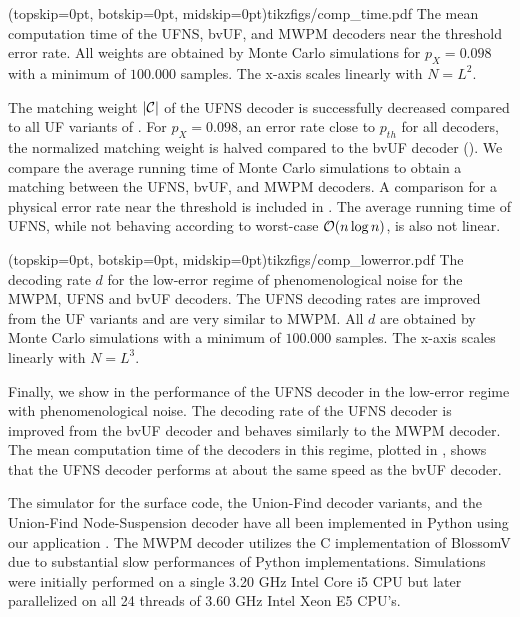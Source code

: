 \Figure[b!](topskip=0pt, botskip=0pt, midskip=0pt){tikzfigs/comp_time.pdf}{
  The mean computation time of the UFNS, bvUF, and MWPM decoders near the threshold error rate. All weights are obtained by Monte Carlo simulations for $p_X=0.098$ with a minimum of $100.000$ samples. The x-axis scales linearly with $N = L^2$.\label{comp_time}}

The matching weight $\lvert\mathcal{C}\rvert$ of the UFNS decoder is successfully decreased compared to all UF variants of . For $p_X = 0.098$, an error rate close to $p_{th}$ for all decoders, the normalized matching weight is halved compared to the bvUF decoder (). We compare the average running time of Monte Carlo simulations to obtain a matching between the UFNS, bvUF, and MWPM decoders. A comparison for a physical error rate near the threshold is included in . The average running time of UFNS, while not behaving according to worst-case $\mathcal{O}(n \log{n})$, is also not linear. 

\Figure[tbh](topskip=0pt, botskip=0pt, midskip=0pt){tikzfigs/comp_lowerror.pdf}{
  The decoding rate $d$ for the low-error regime of phenomenological noise for the MWPM, UFNS and bvUF decoders. The UFNS decoding rates are improved from the UF variants and are very similar to MWPM. All $d$ are obtained by Monte Carlo simulations with a minimum of $100.000$ samples. The x-axis scales linearly with $N = L^3$.\label{comp_lowerror}}

Finally, we show in  the performance of the UFNS decoder in the low-error regime with phenomenological noise. The decoding rate of the UFNS decoder is improved from the bvUF decoder and behaves similarly to the MWPM decoder. The mean computation time of the decoders in this regime, plotted in , shows that the UFNS decoder performs at about the same speed as the bvUF decoder.\par

The simulator for the surface code, the Union-Find decoder variants, and the Union-Find Node-Suspension decoder have all been implemented in Python using our application \cite{OpenSurfaceSim}. The MWPM decoder utilizes the C implementation of BlossomV \cite{kolmogorov2009blossom} due to substantial slow performances of Python implementations. Simulations were initially performed on a single 3.20 GHz Intel Core i5 CPU but later parallelized on all 24 threads of 3.60 GHz Intel Xeon E5 CPU's. 